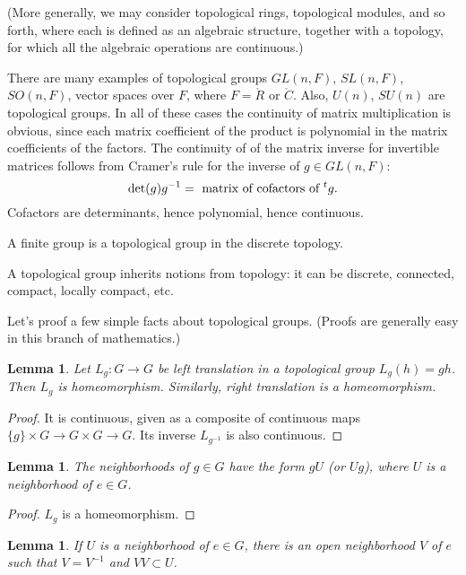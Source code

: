 \documentclass{amsart}
\newtheorem{lemma}[equation]{Lemma}
\def\t#1{\hbox{}^t#1}
\begin{document}
(More generally, we may consider topological rings, topological
modules, and so forth, where each is defined as an algebraic
structure, together with a topology, for which all the algebraic
operations are continuous.)

There are many examples of topological groups $GL(n,F)$, $SL(n,F)$,
$SO(n,F)$, vector spaces over $F$, where $F=\ring{R}$ or $\ring{C}$.
Also, $U(n)$, $SU(n)$ are topological groups.  In all of these cases the
continuity of matrix multiplication is obvious, since each matrix
coefficient of the product is polynomial in the matrix coefficients of
the factors.  The continuity of of the matrix inverse for invertible
matrices follows from Cramer's rule \cite[Prop.~5.4]{knapp-basic} for
the inverse of $g\in GL(n,F)$:
\[
\det(g) g^{-1} = \text{  matrix of cofactors of } \t{g}.
\]
Cofactors are determinants, hence polynomial, hence continuous.

A finite group is a topological group in the discrete topology.

A topological group inherits notions from topology: it can be
discrete, connected, compact, locally compact, etc.

Let's proof a few simple facts about topological groups.  (Proofs are
generally easy in this branch of mathematics.)

\begin{lemma}
Let $L_g:G\to G$ be left translation in a topological group $L_g(h) = g h$.
Then $L_g$ is homeomorphism.  Similarly, right translation is a homeomorphism.
\end{lemma}

\begin{proof}
It is continuous, given as 
a composite of continuous maps $\{g\}\times G \to G\times G \to G$.
Its inverse $L_{g^{-1}}$ is also continuous.
\end{proof}

\begin{lemma}  The neighborhoods of $g\in G$ have the form $g U$ (or $Ug$),
where $U$ is a neighborhood of $e\in G$.
\end{lemma}

\begin{proof} $L_g$ is a homeomorphism.
\end{proof}

\begin{lemma} If $U$ is a neighborhood of $e\in G$, there is an open neighborhood  $V$ of $e$
such that $V= V^{-1}$ and $VV \subset U$.
\end{lemma}
\end{document}
